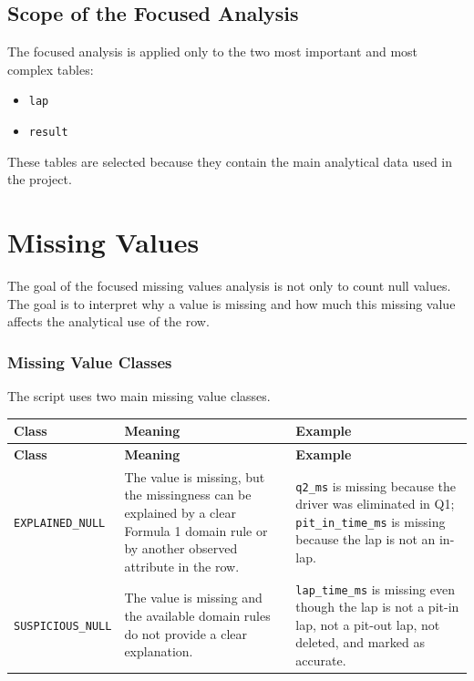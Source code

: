 \documentclass[a4paper,11pt]{article}
\begin{document}
	\subsection{Scope of the Focused Analysis}
	
	The focused analysis is applied only to the two most important and most complex tables:
	
	\begin{itemize}[leftmargin=1.2cm]
		\item \texttt{lap}
		\item \texttt{result}
	\end{itemize}
	
	These tables are selected because they contain the main analytical data used in the project.



	\section{Missing Values}
	
	The goal of the focused missing values analysis is not only to count null values.
	The goal is to interpret why a value is missing and how much this missing value affects the analytical use of the row.
	

	
	\subsubsection{Missing Value Classes}
	
	The script uses two main missing value classes.
	
	\begin{longtable}{p{4cm}p{6cm}p{5.5cm}}
		\toprule
		\textbf{Class} & \textbf{Meaning} & \textbf{Example} \\
		\midrule
		\endfirsthead
		
		\toprule
		\textbf{Class} & \textbf{Meaning} & \textbf{Example} \\
		\midrule
		\endhead
		
		\texttt{EXPLAINED\_NULL}
		& The value is missing, but the missingness can be explained by a clear Formula 1 domain rule or by another observed attribute in the row.
		& \texttt{q2\_ms} is missing because the driver was eliminated in Q1; \texttt{pit\_in\_time\_ms} is missing because the lap is not an in-lap. \\
		\midrule
		
		\texttt{SUSPICIOUS\_NULL}
		& The value is missing and the available domain rules do not provide a clear explanation.
		& \texttt{lap\_time\_ms} is missing even though the lap is not a pit-in lap, not a pit-out lap, not deleted, and marked as accurate. \\
		\bottomrule
	\end{longtable}
		
\end{document}
